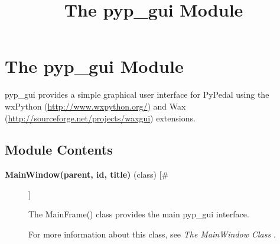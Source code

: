 \documentclass[10pt]{article}
\title{The pyp\_gui Module}
\begin{document}
\section*{The pyp\_gui Module}


 pyp\_gui provides a simple graphical user interface for PyPedal using the wxPython (\url{http://www.wxpython.org/}) and Wax (\url{http://sourceforge.net/projects/waxgui}) extensions.
\subsection*{Module Contents}
\begin{description}
\item[\textbf{MainWindow(parent, id, title)}
 (class) [\#]]

 The MainFrame() class provides the main pyp\_gui interface.


 For more information about this class, see \emph{The MainWindow Class}
.


\end{description}
\end{document}
